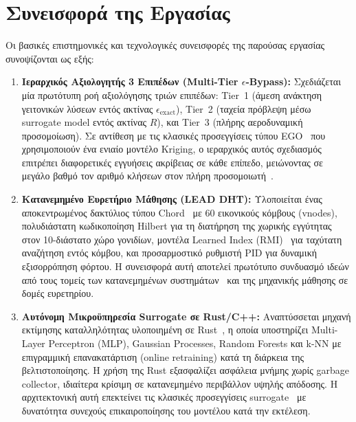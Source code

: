 \section{Συνεισφορά της Εργασίας}
\label{sec:intro_contributions}

Οι βασικές επιστημονικές και τεχνολογικές συνεισφορές της παρούσας εργασίας συνοψίζονται ως εξής:

\begin{enumerate}
    \item \textbf{Ιεραρχικός Αξιολογητής 3 Επιπέδων (Multi-Tier $\epsilon$-Bypass):}
    Σχεδιάζεται μία πρωτότυπη ροή αξιολόγησης τριών επιπέδων: Tier~1 (άμεση ανάκτηση γειτονικών λύσεων εντός ακτίνας $\epsilon_{\text{exact}}$), Tier~2 (ταχεία πρόβλεψη μέσω surrogate model εντός ακτίνας $R$), και Tier~3 (πλήρης αεροδυναμική προσομοίωση). Σε αντίθεση με τις κλασικές προσεγγίσεις τύπου EGO~\cite{jones1998ego,forrester2008engineering} που χρησιμοποιούν ένα ενιαίο μοντέλο Kriging, ο ιεραρχικός αυτός σχεδιασμός επιτρέπει διαφορετικές εγγυήσεις ακρίβειας σε κάθε επίπεδο, μειώνοντας σε μεγάλο βαθμό τον αριθμό κλήσεων στον πλήρη προσομοιωτή~\cite{jin2002framework}.

    \item \textbf{Κατανεμημένο Ευρετήριο Μάθησης (LEAD DHT):}
    Υλοποιείται ένας αποκεντρωμένος δακτύλιος τύπου Chord~\cite{stoica2001chord} με 60 εικονικούς κόμβους (vnodes), πολυδιάστατη κωδικοποίηση Hilbert για τη διατήρηση της χωρικής εγγύτητας στον 10-διάστατο χώρο γονιδίων, μοντέλα Learned Index (RMI)~\cite{kraska2018case} για ταχύτατη αναζήτηση εντός κόμβου, και προσαρμοστικό ρυθμιστή PID για δυναμική εξισορρόπηση φόρτου. Η συνεισφορά αυτή αποτελεί πρωτότυπο συνδυασμό ιδεών από τους τομείς των κατανεμημένων συστημάτων~\cite{wang2025lead} και της μηχανικής μάθησης σε δομές ευρετηρίου.

    \item \textbf{Αυτόνομη Μικροϋπηρεσία Surrogate σε Rust/C++:}
    Αναπτύσσεται μηχανή εκτίμησης καταλληλότητας υλοποιημένη σε Rust~\cite{matsakis2014rust}, η οποία υποστηρίζει Multi-Layer Perceptron (MLP), Gaussian Processes, Random Forests και k-NN με επιγραμμική επανακατάρτιση (online retraining) κατά τη διάρκεια της βελτιστοποίησης. Η χρήση της Rust εξασφαλίζει ασφάλεια μνήμης χωρίς garbage collector, ιδιαίτερα κρίσιμη σε κατανεμημένο περιβάλλον υψηλής απόδοσης. Η αρχιτεκτονική αυτή επεκτείνει τις κλασικές προσεγγίσεις surrogate~\cite{jin2011surrogate} με δυνατότητα συνεχούς επικαιροποίησης του μοντέλου κατά την εκτέλεση.


\end{enumerate}
